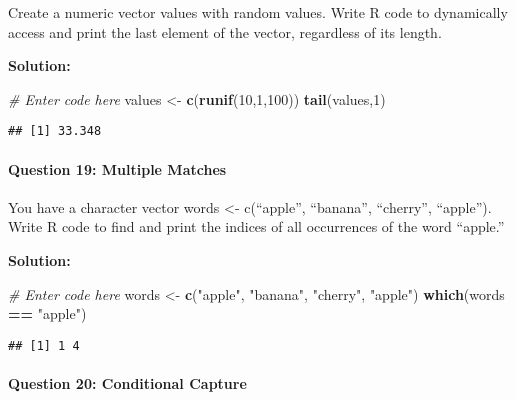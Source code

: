 \documentclass[
]{article}
\newenvironment{Shaded}{\begin{snugshade}}{\end{snugshade}}
\newcommand{\CommentTok}[1]{\textcolor[rgb]{0.56,0.35,0.01}{\textit{#1}}}
\newcommand{\DecValTok}[1]{\textcolor[rgb]{0.00,0.00,0.81}{#1}}
\newcommand{\FunctionTok}[1]{\textcolor[rgb]{0.13,0.29,0.53}{\textbf{#1}}}
\newcommand{\NormalTok}[1]{#1}
\newcommand{\OtherTok}[1]{\textcolor[rgb]{0.56,0.35,0.01}{#1}}
\newcommand{\SpecialCharTok}[1]{\textcolor[rgb]{0.81,0.36,0.00}{\textbf{#1}}}
\newcommand{\StringTok}[1]{\textcolor[rgb]{0.31,0.60,0.02}{#1}}
\begin{document}
Create a numeric vector values with random values. Write R code to
dynamically access and print the last element of the vector, regardless
of its length.

\textbf{Solution:}

\begin{Shaded}
\begin{Highlighting}[]
\CommentTok{\# Enter code here}
\NormalTok{values }\OtherTok{\textless{}{-}} \FunctionTok{c}\NormalTok{(}\FunctionTok{runif}\NormalTok{(}\DecValTok{10}\NormalTok{,}\DecValTok{1}\NormalTok{,}\DecValTok{100}\NormalTok{))}
\FunctionTok{tail}\NormalTok{(values,}\DecValTok{1}\NormalTok{)}
\end{Highlighting}
\end{Shaded}

\begin{verbatim}
## [1] 33.348
\end{verbatim}

\hypertarget{question-19-multiple-matches}{%
\paragraph{Question 19: Multiple
Matches}\label{question-19-multiple-matches}}

You have a character vector words \textless- c(``apple'', ``banana'',
``cherry'', ``apple''). Write R code to find and print the indices of
all occurrences of the word ``apple.''

\textbf{Solution:}

\begin{Shaded}
\begin{Highlighting}[]
\CommentTok{\# Enter code here}
\NormalTok{words }\OtherTok{\textless{}{-}} \FunctionTok{c}\NormalTok{(}\StringTok{"apple"}\NormalTok{, }\StringTok{"banana"}\NormalTok{, }\StringTok{"cherry"}\NormalTok{, }\StringTok{"apple"}\NormalTok{)}
\FunctionTok{which}\NormalTok{(words }\SpecialCharTok{==} \StringTok{"apple"}\NormalTok{)}
\end{Highlighting}
\end{Shaded}

\begin{verbatim}
## [1] 1 4
\end{verbatim}

\hypertarget{question-20-conditional-capture}{%
\paragraph{Question 20: Conditional
Capture}\label{question-20-conditional-capture}}
\end{document}
